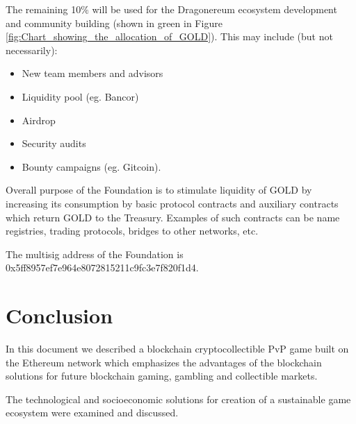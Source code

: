 \documentclass[12pt]{article}
\begin{document}
The remaining 10$\%$  will be used for the Dragonereum ecosystem development and community building (shown in green in Figure \ref{fig:Chart_showing_the_allocation_of_GOLD}). This may include (but not necessarily):\par

\begin{itemize}
	\item New team members and advisors\par

	\item Liquidity pool (eg. Bancor)\par

	\item Airdrop\par

	\item Security audits\par

	\item Bounty campaigns (eg. Gitcoin).
\end{itemize}\par

Overall purpose of the Foundation is to stimulate liquidity of GOLD by increasing its consumption by basic protocol contracts and auxiliary contracts which return GOLD to the Treasury. Examples of such contracts can be name registries, trading protocols, bridges to other networks, etc.\par

The multisig address of the Foundation is 0x5ff8957ef7e964e8072815211c9fc3e7f820f1d4.\par


\newpage

\vspace{\baselineskip}\section{Conclusion}
In this document we described a blockchain cryptocollectible PvP game built on the Ethereum network which emphasizes the advantages of the blockchain solutions for future blockchain gaming, gambling and collectible markets.  \par

The technological and socioeconomic solutions for creation of a sustainable game ecosystem were examined and discussed.\par
\end{document}
